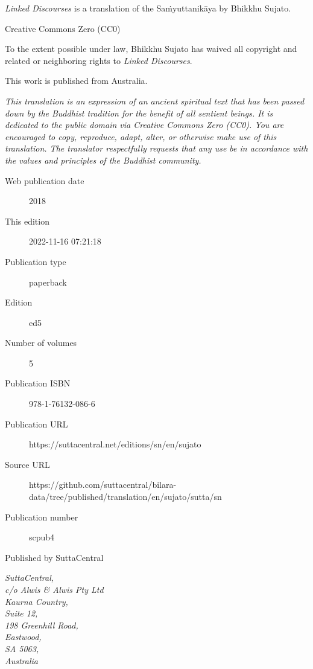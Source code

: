 \documentclass[12pt,openany]{book}%
\begin{document}
\begin{footnotesize}

\textit{Linked Discourses} is a translation of the Saṁyuttanikāya by Bhikkhu Sujato.

\medskip

Creative Commons Zero (CC0)

To the extent possible under law, Bhikkhu Sujato has waived all copyright and related or neighboring rights to \textit{Linked Discourses}.

\medskip

This work is published from Australia.

\begin{center}
\textit{This translation is an expression of an ancient spiritual text that has been passed down by the Buddhist tradition for the benefit of all sentient beings. It is dedicated to the public domain via Creative Commons Zero (CC0). You are encouraged to copy, reproduce, adapt, alter, or otherwise make use of this translation. The translator respectfully requests that any use be in accordance with the values and principles of the Buddhist community.}
\end{center}

\medskip

\begin{description}
    \item[Web publication date] 2018
    \item[This edition] 2022-11-16 07:21:18
    \item[Publication type] paperback
    \item[Edition] ed5
    \item[Number of volumes] 5
    \item[Publication ISBN] 978-1-76132-086-6
    \item[Publication URL] https://suttacentral.net/editions/sn/en/sujato
    \item[Source URL] https://github.com/suttacentral/bilara-data/tree/published/translation/en/sujato/sutta/sn
    \item[Publication number] scpub4
\end{description}

\medskip

Published by SuttaCentral

\medskip

\textit{SuttaCentral,\\
c/o Alwis \& Alwis Pty Ltd\\
Kaurna Country,\\
Suite 12,\\
198 Greenhill Road,\\
Eastwood,\\
SA 5063,\\
Australia}

\end{footnotesize}
\end{document}
